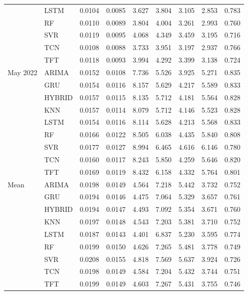 \begin{tabular}{lllllllll}
 & LSTM & 0.0104 & 0.0085 & 3.627 & 3.804 & 3.105 & 2.853 & 0.783 \\
 & RF & 0.0110 & 0.0089 & 3.804 & 4.004 & 3.261 & 2.993 & 0.760 \\
 & SVR & 0.0119 & 0.0095 & 4.068 & 4.349 & 3.459 & 3.195 & 0.716 \\
 & TCN & 0.0108 & 0.0088 & 3.733 & 3.951 & 3.197 & 2.937 & 0.766 \\
 & TFT & 0.0118 & 0.0093 & 3.994 & 4.292 & 3.399 & 3.138 & 0.724 \\
May 2022 & ARIMA & 0.0152 & 0.0108 & 7.736 & 5.526 & 3.925 & 5.271 & 0.835 \\
 & GRU & 0.0154 & 0.0116 & 8.157 & 5.629 & 4.217 & 5.589 & 0.833 \\
 & HYBRID & 0.0157 & 0.0115 & 8.135 & 5.712 & 4.181 & 5.564 & 0.828 \\
 & KNN & 0.0157 & 0.0114 & 8.079 & 5.712 & 4.146 & 5.523 & 0.828 \\
 & LSTM & 0.0154 & 0.0116 & 8.114 & 5.628 & 4.213 & 5.568 & 0.833 \\
 & RF & 0.0166 & 0.0122 & 8.505 & 6.038 & 4.435 & 5.840 & 0.808 \\
 & SVR & 0.0177 & 0.0127 & 8.994 & 6.465 & 4.616 & 6.146 & 0.780 \\
 & TCN & 0.0160 & 0.0117 & 8.243 & 5.850 & 4.259 & 5.646 & 0.820 \\
 & TFT & 0.0169 & 0.0119 & 8.432 & 6.158 & 4.332 & 5.764 & 0.801 \\
Mean & ARIMA & 0.0198 & 0.0149 & 4.564 & 7.218 & 5.442 & 3.732 & 0.752 \\
 & GRU & 0.0194 & 0.0146 & 4.475 & 7.064 & 5.329 & 3.657 & 0.761 \\
 & HYBRID & 0.0194 & 0.0147 & 4.493 & 7.092 & 5.354 & 3.671 & 0.760 \\
 & KNN & 0.0197 & 0.0148 & 4.543 & 7.203 & 5.381 & 3.710 & 0.752 \\
 & LSTM & 0.0187 & 0.0143 & 4.401 & 6.837 & 5.230 & 3.595 & 0.774 \\
 & RF & 0.0199 & 0.0150 & 4.626 & 7.265 & 5.481 & 3.778 & 0.749 \\
 & SVR & 0.0208 & 0.0155 & 4.818 & 7.569 & 5.637 & 3.924 & 0.726 \\
 & TCN & 0.0198 & 0.0149 & 4.584 & 7.204 & 5.432 & 3.744 & 0.751 \\
 & TFT & 0.0199 & 0.0149 & 4.603 & 7.267 & 5.431 & 3.755 & 0.746 \\
\bottomrule
\end{tabular}
